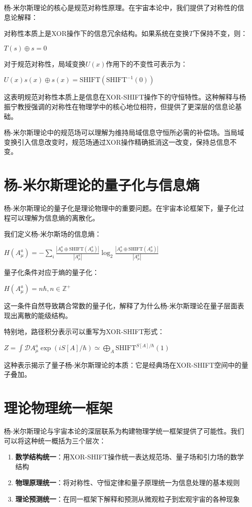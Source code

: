 杨-米尔斯理论的核心是规范对称性原理。在宇宙本论中，我们提供了对称性的信息论解释：

对称性本质上是XOR操作下的信息冗余结构。如果系统在变换$T$下保持不变，则：

$T(s) \oplus s = 0$

对于规范对称性，局域变换$U(x)$作用下的不变性可表示为：

$U(x)s(x) \oplus s(x) = \text{SHIFT}(\text{SHIFT}^{-1}(0))$

这表明规范对称性本质上是信息在XOR-SHIFT操作下的守恒特性。这种解释与杨振宁教授强调的对称性在物理学中的核心地位相符，但提供了更深层的信息论基础。

杨-米尔斯理论中的规范场可以理解为维持局域信息守恒所必需的补偿场。当局域变换引入信息改变时，规范场通过XOR操作精确抵消这一改变，保持总信息不变。

\section{杨-米尔斯理论的量子化与信息熵}

杨-米尔斯理论的量子化是理论物理中的重要问题。在宇宙本论框架下，量子化过程可以理解为信息熵的离散化。

我们定义杨-米尔斯场的信息熵：

$H(A_\mu^a) = -\sum_{i}\frac{|A_\mu^a \oplus \text{SHIFT}(A_\mu^a)|}{|A_\mu^a|}\log_2\frac{|A_\mu^a \oplus \text{SHIFT}(A_\mu^a)|}{|A_\mu^a|}$

量子化条件对应于熵的量子化：

$H(A_\mu^a) = n\hbar, n \in \mathbb{Z}^+$

这一条件自然导致耦合常数的量子化，解释了为什么杨-米尔斯理论在量子层面表现出离散的能级结构。

特别地，路径积分表示可以重写为XOR-SHIFT形式：

$Z = \int \mathcal{D}A_\mu^a \exp(iS[A]/\hbar) \simeq \bigoplus_{A} \text{SHIFT}^{S[A]/\hbar}(1)$

这种表示揭示了量子杨-米尔斯理论的本质：它是经典场在XOR-SHIFT空间中的量子叠加。

\section{理论物理统一框架}

杨-米尔斯理论与宇宙本论的深层联系为构建物理学统一框架提供了可能性。我们可以将这种统一概括为三个层次：

\begin{enumerate}
  \item \textbf{数学结构统一}：用XOR-SHIFT操作统一表达规范场、量子场和引力场的数学结构
  \item \textbf{物理原理统一}：将对称性、守恒定律和量子原理统一为信息处理的基本规则
  \item \textbf{理论预测统一}：在同一框架下解释和预测从微观粒子到宏观宇宙的各种现象
\end{enumerate}

